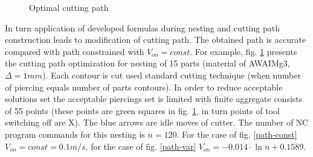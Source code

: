 \documentclass[runningheads]{llncs}
\begin{document}
\begin{figure}
  \centering
  \caption{Optimal cutting path }
  \label{optimal-paths}
\end{figure}

In turn application of developed formulas
during nesting and cutting path construction
leads to modification of cutting path.
The obtained path is accurate
compared with path constrained with
$V_{on}=const$.
For example,
fig. \ref{optimal-paths}
presents the cutting path optimization
for nesting of 15 parts
(material of AWAIMg3, $\Delta=1 mm$).
Each contour is cut used standard cutting technique
(when number of piercing equals number of parts contours).
In order to reduce acceptable solutions set
the acceptable piercings set is limited with finite aggregate consists of 55 points
(these points are green squares in fig. \ref{optimal-paths},
in turn points of tool switching off are X).
The blue arrows are idle moves of cutter.
The number of NC program commands for this nesting is
$n=120$.
For the case of fig. \ref{path-const}
$V_{on}=const=0.1 m/s$,
for the case of fig. \ref{path-var}
$V_{on}=-0.014 \cdot \ln n + 0.1589$.
\end{document}
